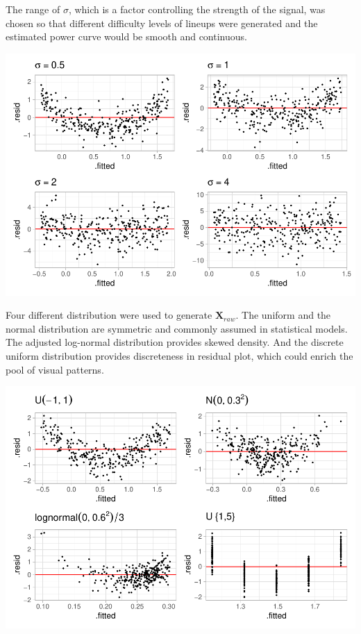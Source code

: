 \documentclass[]{interact}
\theoremstyle{plain}%
\theoremstyle{definition}
\theoremstyle{remark}
\begin{document}
The range of \(\sigma\), which is a factor controlling the strength of
the signal, was chosen so that different difficulty levels of lineups
were generated and the estimated power curve would be smooth and
continuous.

\includegraphics{paper_comparison_files/figure-latex/different-sigma-1.pdf}

Four different distribution were used to generate
\(\boldsymbol{X}_{raw}\). The uniform and the normal distribution are
symmetric and commonly assumed in statistical models. The adjusted
log-normal distribution provides skewed density. And the discrete
uniform distribution provides discreteness in residual plot, which could
enrich the pool of visual patterns.

\includegraphics{paper_comparison_files/figure-latex/different-dist-1.pdf}
\end{document}
